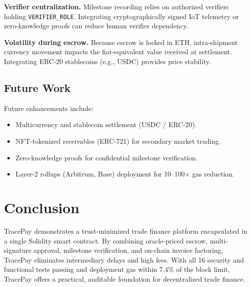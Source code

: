 \documentclass[conference]{IEEEtran}
\begin{document}
\textbf{Verifier centralization.}
Milestone recording relies on authorized verifiers holding
\texttt{VERIFIER\_ROLE}.
Integrating cryptographically signed IoT telemetry or zero-knowledge
proofs can reduce human verifier dependency.

\textbf{Volatility during escrow.}
Because escrow is locked in ETH, intra-shipment currency movement
impacts the fiat-equivalent value received at settlement.
Integrating ERC-20 stablecoins (e.g., USDC) provides price stability.

\subsection{Future Work}

Future enhancements include:
\begin{itemize}
  \item Multicurrency and stablecoin settlement (USDC / ERC-20).
  \item NFT-tokenized receivables (ERC-721) for secondary market trading.
  \item Zero-knowledge proofs for confidential milestone verification.
  \item Layer-2 rollups (Arbitrum, Base) deployment for 10--100$\times$ gas reduction.
\end{itemize}

\section{Conclusion}
\label{sec:conclusion}

TracePay demonstrates a trust-minimized trade finance platform
encapsulated in a single Solidity smart contract.
By combining oracle-priced escrow, multi-signature approval, milestone
verification, and on-chain invoice factoring, TracePay eliminates
intermediary delays and high fees.
With all 16 security and functional tests passing and deployment gas
within 7.4\% of the block limit, TracePay offers a practical,
auditable foundation for decentralized trade finance.

\balance


\end{document}
